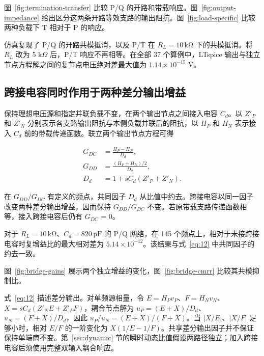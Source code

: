 图~\ref{fig:termination-transfer} 比较 P/Q 的开路和带载响应。图~\ref{fig:output-impedance} 给出区分这两条开路等效支路的输出阻抗。图~\ref{fig:load-specific} 比较两种负载下 T 相对于 P 的响应。



仿真复现了 P/Q 的开路共模抵消，以及 P/T 在 \(R_L=10\,\mathrm{k\Omega}\) 下的共模抵消。将 \(R_L\) 改为 5 k\(\Omega\) 后，P/T 响应不再相等。在全部 37 个算例中，LTspice 输出与独立节点方程解之间的复节点电压绝对差最大值为 \(1.14\times10^{-15}\) V。





\subsection{跨接电容同时作用于两种差分输出增益}

保持理想电压源和指定并联负载不变，在两个输出节点之间接入电容 \(C_d\)。以 \(Z'_P\) 和 \(Z'_N\) 分别表示各支路输出阻抗与本侧负载并联后的阻抗，以 \(H_P\) 和 \(H_N\) 表示接入 \(C_d\) 前的带载传递函数。联立两个输出节点方程可得

\begin{equation}\label{eq:12}
\begin{aligned}
G_{DC}&=\frac{H_P-H_N}{D_d},\\
G_{DD}&=\frac{(H_P+H_N)/2}{D_d},\\
D_d&=1+sC_d(Z'_P+Z'_N).
\end{aligned}
\end{equation}

在 \(G_{DD}/G_{DC}\) 有定义的频点，共同因子 \(D_d\) 从比值中约去。跨接电容以同一因子改变两种差分输出增益，因而保持 \(G_{DD}/G_{DC}\) 不变。若原带载支路传递函数相等，接入跨接电容后仍有 \(G_{DC}\) = 0。

对于 \(R_L=10\,\mathrm{k\Omega}\)、\(C_d=820\,\mathrm{pF}\) 的 P/Q 网络，在 145 个频点上，相对于未接跨接电容时复增益比的最大相对差为 \(5.14\times10^{-12}\)。该结果与式~\eqref{eq:12} 中共同因子的约去一致。


图~\ref{fig:bridge-gains} 展示两个独立增益的变化，图~\ref{fig:bridge-cmrr} 比较其共模抑制比。

式~\eqref{eq:12} 描述差分输出。对单频源相量，令 $E=H_Pv_P$、$F=H_Nv_N$、$X=sC_d(Z'_NE+Z'_PF)$，耦合节点解为 $u_P=(E+X)/D_d$、$u_N=(F+X)/D_d$，因此 $u_P/u_N=(E+X)/(F+X)$。当 $|X/E|$、$|X/F|$ 足够小时，相对 $E/F$ 的一阶变化为 $X(1/E-1/F)$。共享差分输出因子并不保证保持单端商不变。第~\ref{sec:dynamic} 节的瞬时动态比值假设两路径独立；加入跨接电容后须使用完整双输入耦合响应。

